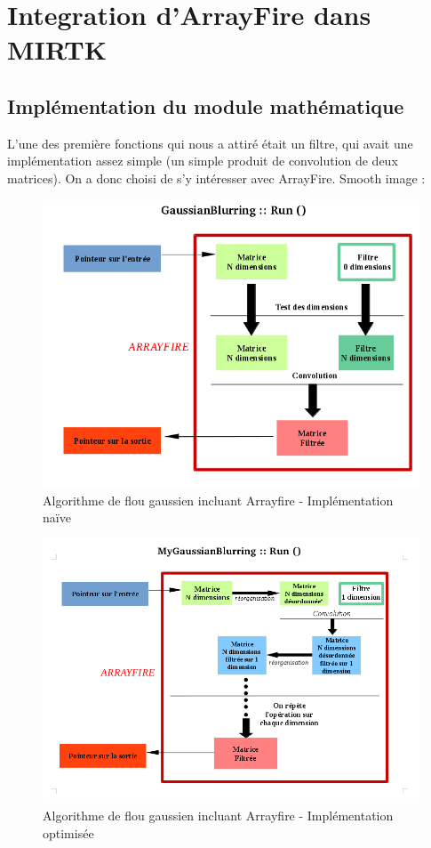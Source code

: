 \documentclass[10pt]{report}
\begin{document}
	
	\section{Integration d'ArrayFire dans MIRTK}
	\subsection{Implémentation du module mathématique}
L'une des première fonctions qui nous a attiré était un filtre, qui avait une implémentation assez simple (un simple produit de convolution de deux matrices). On a donc choisi de s'y intéresser avec ArrayFire.
Smooth image :
	\begin{figure}[h!]
		\begin{center}
			\includegraphics[width=12cm]{Reports/figures/gaussianblurring.png}
		\end{center}	
		\caption{Algorithme de flou gaussien incluant Arrayfire - Implémentation naïve}
		\label{Algorithme de flou gaussien incluant Arrayfire - Implémentation naïve}
	\end{figure}
	\begin{figure}[h!]
		\begin{center}
			\includegraphics[width=12cm]{Reports/figures/mygaussianblurring.png}
		\end{center}	
		\caption{Algorithme de flou gaussien incluant Arrayfire - Implémentation optimisée}
		\label{Algorithme de flou gaussien incluant Arrayfire - Implémentation optimisée}
	\end{figure}~\par
\end{document}
